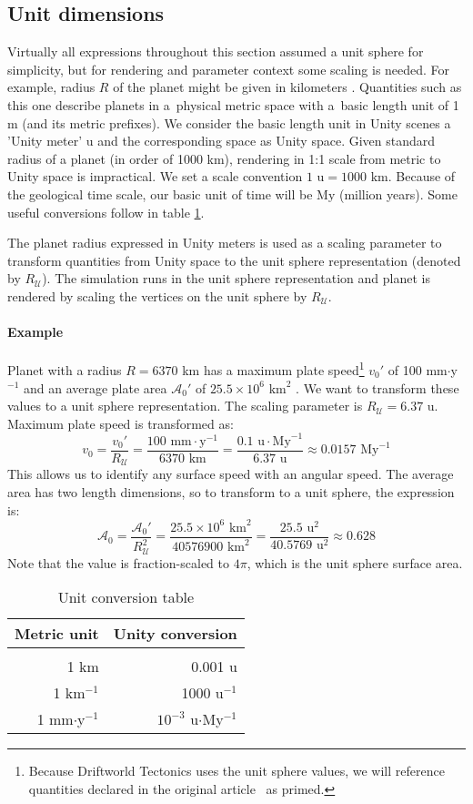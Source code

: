\subsection{Unit dimensions}
Virtually all expressions throughout this section assumed a unit sphere for simplicity, but for rendering and parameter context some scaling is needed. For example, radius $R$ of the planet might be given in kilometers \cite{cortial}. Quantities such as this one describe planets in a~physical metric space with a~basic length unit of 1 m (and its metric prefixes). We consider the basic length unit in Unity scenes a 'Unity meter' $\mbox{u}$ and the corresponding space as Unity space. Given standard radius of a planet (in order of 1000 km), rendering in 1:1 scale from metric to Unity space is impractical. We set a scale convention $1\mbox{ u}=1000\mbox{ km}$. Because of the geological time scale, our basic unit of time will be $\mbox{My}$ (million years). Some useful conversions follow in table \ref{tab:unit-conversion}.

The planet radius expressed in Unity meters is used as a scaling parameter to transform quantities from Unity space to the unit sphere representation (denoted by $R_\mathcal{U}$). The simulation runs in the unit sphere representation and planet is rendered by scaling the vertices on the unit sphere by $R_\mathcal{U}$.

\paragraph{Example}Planet with a radius $R=6370$ km has a maximum plate speed\footnote{Because Driftworld Tectonics uses the unit sphere values, we will reference quantities declared in the original article~\cite{cortial} as primed.} $v_0'$ of 100 mm$\cdot$y$^{-1}$ and an average plate area $\mathcal{A}_0'$ of $25.5\times 10^{6}\mbox{ km}^2$ . We want to transform these values to a unit sphere representation. The scaling parameter is  $R_\mathcal{U}=6.37$ u. Maximum plate speed is transformed as:
$$v_0 = \frac{v_0'}{R_\mathcal{U}} =  \frac{100\mbox{ mm}\cdot\mbox{y}^{-1}}{6370\mbox{ km}}=\frac{0.1\mbox{ u}\cdot\mbox{My}^{-1}}{6.37\mbox{ u}}\approx 0.0157\mbox{ My}^{-1}$$
This allows us to identify any surface speed with an angular speed. The average area has two length dimensions, so to transform to a unit sphere, the expression is:
$$\mathcal{A}_0 = \frac{\mathcal{A}_0'}{R_\mathcal{U}^2} =  \frac{25.5\times 10^{6}\mbox{ km}^2}{40576900\mbox{ km}^2}= \frac{25.5\mbox{ u}^2}{40.5769\mbox{ u}^2}\approx 0.628$$
Note that the value is fraction-scaled to $4\pi$, which is the unit sphere surface area.
\begin{table}
\centering
\begin{tabular}{rr}
\textbf{Metric unit}&\textbf{Unity conversion}\\
\hline\\
1 km&0.001 u\\
1 km$^{-1}$&1000 u$^{-1}$\\
1 mm$\cdot$y$^{-1}$&$10^{-3}$ u$\cdot$My$^{-1}$
\end{tabular}
\caption{Unit conversion table}
\label{tab:unit-conversion}
\end{table}
